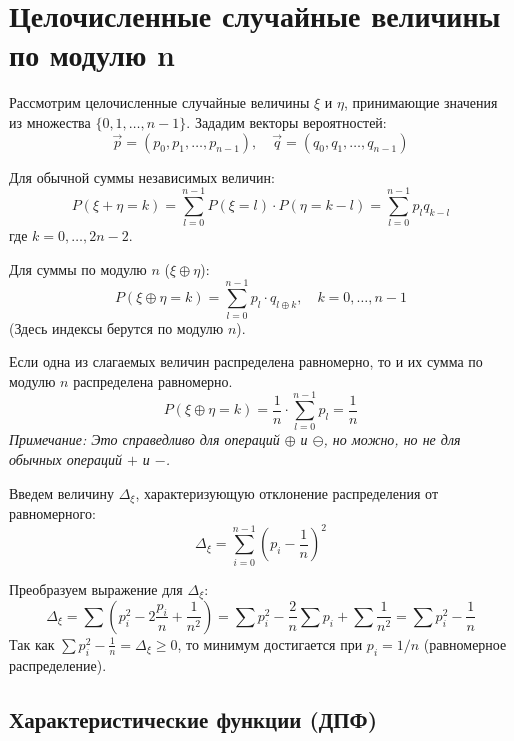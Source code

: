 \section{Целочисленные случайные величины по модулю n}

Рассмотрим целочисленные случайные величины $\xi$ и $\eta$, принимающие значения из множества $\{0, 1, \dots, n-1\}$.
Зададим векторы вероятностей:
$$ \vec{p} = (p_0, p_1, \dots, p_{n-1}), \quad \vec{q} = (q_0, q_1, \dots, q_{n-1}) $$

\begin{statement}
Для обычной суммы независимых величин:
$$ P(\xi + \eta = k) = \sum_{l=0}^{n-1} P(\xi = l) \cdot P(\eta = k-l) = \sum_{l=0}^{n-1} p_l q_{k-l} $$
где $k = 0, \dots, 2n-2$.
\end{statement}

\begin{statement}
Для суммы по модулю $n$ ($\xi \oplus \eta$):
$$ P(\xi \oplus \eta = k) = \sum_{l=0}^{n-1} p_l \cdot q_{l \oplus k}, \quad k = 0, \dots, n-1 $$
(Здесь индексы берутся по модулю $n$).
\end{statement}

\begin{theorem}
Если одна из слагаемых величин распределена равномерно, то и их сумма по модулю $n$ распределена равномерно.
$$ P(\xi \oplus \eta = k) = \frac{1}{n} \cdot \sum_{l=0}^{n-1} p_l = \frac{1}{n} $$
\textit{Примечание: Это справедливо для операций $\oplus$ и $\ominus$, но можно, но не для обычных операций $+$ и $-$.}
\end{theorem}

\begin{definition}
Введем величину $\Delta_\xi$, характеризующую отклонение распределения от равномерного:
$$ \Delta_\xi = \sum_{i=0}^{n-1} \left(p_i - \frac{1}{n}\right)^2 $$
\end{definition}

\begin{statement}
Преобразуем выражение для $\Delta_\xi$:
$$ \Delta_\xi = \sum \left(p_i^2 - 2\frac{p_i}{n} + \frac{1}{n^2}\right) = \sum p_i^2 - \frac{2}{n}\sum p_i + \sum \frac{1}{n^2} = \sum p_i^2 - \frac{1}{n} $$
Так как $\sum p_i^2 - \frac{1}{n} = \Delta_\xi \ge 0$, то минимум достигается при $p_i = 1/n$ (равномерное распределение).
\end{statement}

\subsection{Характеристические функции (ДПФ)}

